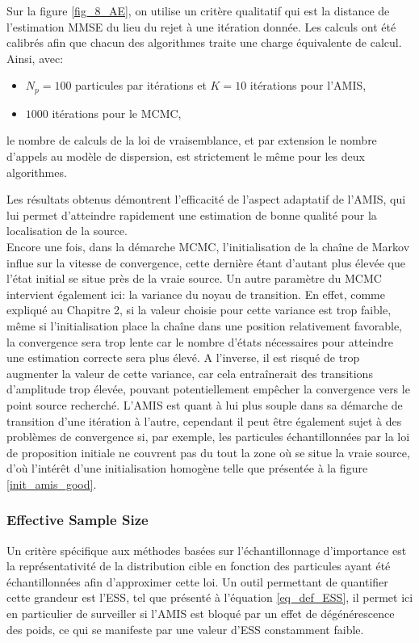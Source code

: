  Sur la figure \ref{fig_8_AE}, on utilise un critère qualitatif qui est la distance de l'estimation MMSE du lieu du rejet à une itération donnée. Les calculs ont été calibrés afin que chacun des algorithmes traite une charge équivalente de calcul. Ainsi, avec:
 \begin{itemize}
 	\item $N_p=100$ particules par itérations et $K=10$ itérations pour l'AMIS,
 	\item $1000$ itérations pour le MCMC,
 \end{itemize} 
 le nombre de calculs de la loi de vraisemblance, et par extension le nombre d'appels au modèle de dispersion, est strictement le même pour les deux algorithmes. 
 
 Les résultats obtenus démontrent l'efficacité de l'aspect adaptatif de l'AMIS, qui lui permet d'atteindre rapidement une estimation de bonne qualité pour la localisation de la source.\\
 
 Encore une fois, dans la démarche MCMC, l'initialisation de la chaîne de Markov influe sur la vitesse de convergence, cette dernière étant d'autant plus élevée que l'état initial se situe près de la vraie source. Un autre paramètre du MCMC intervient également ici: la variance du noyau de transition. En effet, comme expliqué au Chapitre 2, si la valeur choisie pour cette variance est trop faible, même si l'initialisation place la chaîne dans une position relativement favorable, la convergence sera trop lente car le nombre d'états nécessaires pour atteindre une estimation correcte sera plus élevé. A l'inverse, il est risqué de trop augmenter la valeur de cette variance, car cela entraînerait des transitions d'amplitude trop élevée, pouvant potentiellement empêcher la convergence vers le point source recherché. L'AMIS est quant à lui plus souple dans sa démarche de transition d'une itération à l'autre, cependant il peut être également sujet à des problèmes de convergence si, par exemple, les particules échantillonnées par la loi de proposition initiale ne couvrent pas du tout la zone où se situe la vraie source, d'où l'intérêt d'une initialisation homogène telle que présentée à la figure \ref{init_amis_good}.\\
 
 \subsubsection{Effective Sample Size}
 
 Un critère spécifique aux méthodes basées sur l'échantillonnage d'importance est la représentativité de la distribution cible en fonction des particules ayant été échantillonnées afin d'approximer cette loi. Un outil permettant de quantifier cette grandeur est l'ESS, tel que présenté à l'équation \eqref{eq_def_ESS}, il permet ici en particulier de surveiller si l'AMIS est bloqué par un effet de dégénérescence des poids, ce qui se manifeste par une valeur d'ESS constamment faible. \\
 
